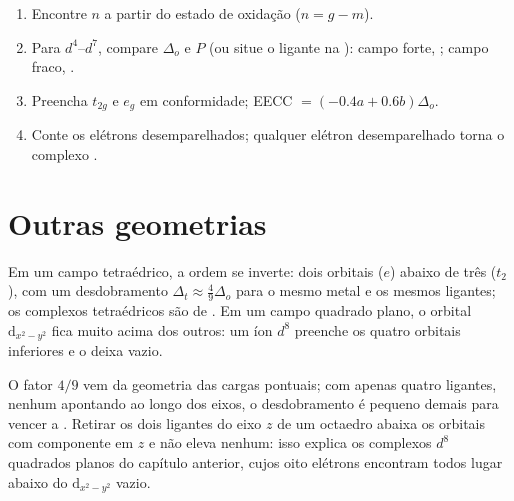 \begin{method}\label{met:b2:ligand-field:spin-state}
\begin{enumerate}
  \item Encontre $n$ a partir do estado de oxidação ($n = g - m$).
  \item Para $d^4$--$d^7$, compare $\Delta_o$ e $P$ (ou situe o ligante na ): campo forte, ; campo fraco, .
  \item Preencha $t_{2g}$ e $e_g$ em conformidade; EECC $= (-0.4a + 0.6b)\Delta_o$.
  \item Conte os elétrons desemparelhados; qualquer elétron desemparelhado
        torna o complexo .
\end{enumerate}
\end{method}

\section{Outras geometrias}

\begin{proposition}\label{prop:b2:ligand-field:tetrahedral}
Em um campo tetraédrico, a ordem se inverte: dois orbitais ($e$) abaixo de três ($t_2$),
com um desdobramento $\Delta_t \approx \frac49\Delta_o$ para o mesmo metal e os mesmos
ligantes; os complexos tetraédricos são de . Em um campo quadrado
plano, o orbital $\mathrm d_{x^2-y^2}$ fica muito acima dos outros: um íon $d^8$
preenche os quatro orbitais inferiores e o deixa vazio.
\end{proposition}

\admitted

O fator $4/9$ vem da geometria das cargas pontuais; com apenas quatro
ligantes, nenhum apontando ao longo dos eixos, o desdobramento é pequeno demais
para vencer a . Retirar os dois ligantes do eixo $z$
de um octaedro abaixa os orbitais com componente em $z$ e não eleva nenhum:
isso explica os complexos $d^8$ quadrados planos do capítulo anterior, cujos
oito elétrons encontram todos lugar abaixo do $\mathrm d_{x^2-y^2}$ vazio.


